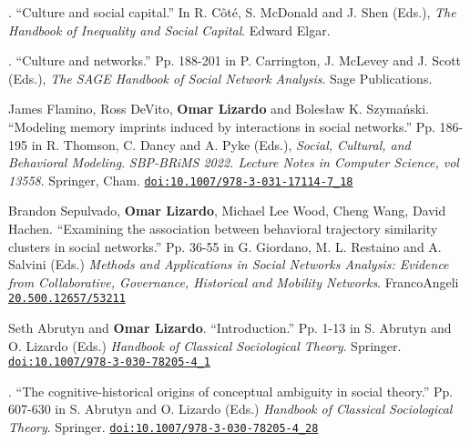 



. ``Culture and social capital.'' In R. C\^{o}t\'{e}, S. McDonald and J. Shen (Eds.), {\em The Handbook of Inequality and Social Capital}. Edward Elgar.

. ``Culture and networks.'' Pp. 188-201 in P. Carrington, J. McLevey and J. Scott (Eds.), {\em The SAGE Handbook of Social Network Analysis}. Sage Publications. 

\ind James Flamino, Ross DeVito, {\bf Omar Lizardo} and Boles\l{}aw K. Szyma\'{n}ski. ``Modeling memory imprints induced by interactions in social networks.'' Pp. 186-195 in R. Thomson, C. Dancy and A. Pyke (Eds.), {\em Social, Cultural, and Behavioral Modeling}. {\em SBP-BRiMS 2022. Lecture Notes in Computer Science, vol 13558}. Springer, Cham. \href{https://doi.org/10.1007/978-3-031-17114-7_18}{\nolinkurl{doi:10.1007/978-3-031-17114-7_18}}

\ind Brandon Sepulvado, {\bf Omar Lizardo}, Michael Lee Wood, Cheng Wang, David Hachen. ``Examining the association between behavioral trajectory similarity clusters in social networks.'' Pp. 36-55 in G. Giordano, M. L. Restaino and A. Salvini (Eds.)  {\em Methods and Applications in Social Networks Analysis: Evidence from Collaborative, Governance, Historical and Mobility Networks}. FrancoAngeli \href{https://library.oapen.org/handle/20.500.12657/53211}{\nolinkurl{20.500.12657/53211}}

\ind Seth Abrutyn and {\bf Omar Lizardo}. ``Introduction.'' Pp. 1-13 in S. Abrutyn and O. Lizardo (Eds.) {\em Handbook of Classical Sociological Theory}. Springer. \href{https://doi.org/10.1007/978-3-030-78205-4_1}{\nolinkurl{doi:10.1007/978-3-030-78205-4_1}}

. ``The cognitive-historical origins of conceptual ambiguity in social theory.'' Pp. 607-630 in S. Abrutyn and O. Lizardo (Eds.) {\em Handbook of Classical Sociological Theory}. Springer. \href{https://doi.org/10.1007/978-3-030-78205-4_28}{\nolinkurl{doi:10.1007/978-3-030-78205-4_28}}
